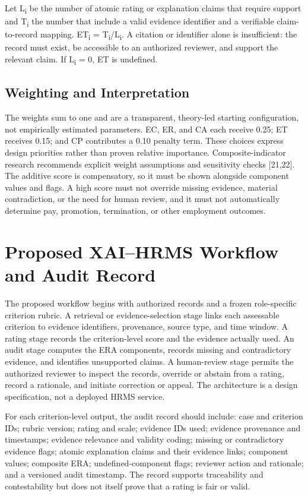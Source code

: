 \documentclass[
  10pt,
  a4paper,
  runningheads]{llncs}
\begin{document}
Let L\textsubscript{i} be the number of atomic rating or explanation claims that require
support and T\textsubscript{i} the number that include a valid evidence identifier and a
verifiable claim-to-record mapping. ET\textsubscript{i} = T\textsubscript{i}/L\textsubscript{i}. A citation or
identifier alone is insufficient: the record must exist, be accessible
to an authorized reviewer, and support the relevant claim. If L\textsubscript{i} = 0, ET
is undefined.

\subsection{Weighting and
Interpretation}\label{weighting-and-interpretation}

The weights sum to one and are a transparent, theory-led starting
configuration, not empirically estimated parameters. EC, ER, and CA each
receive 0.25; ET receives 0.15; and CP contributes a 0.10 penalty term.
These choices express design priorities rather than proven relative
importance. Composite-indicator research recommends explicit weight
assumptions and sensitivity checks {[}21,22{]}. The additive score is
compensatory, so it must be shown alongside component values and flags.
A high score must not override missing evidence, material contradiction,
or the need for human review, and it must not automatically determine
pay, promotion, termination, or other employment outcomes.

\section{Proposed XAI--HRMS Workflow and Audit
Record}\label{proposed-xaihrms-workflow-and-audit-record}

The proposed workflow begins with authorized records and a frozen
role-specific criterion rubric. A retrieval or evidence-selection stage
links each assessable criterion to evidence identifiers, provenance,
source type, and time window. A rating stage records the criterion-level
score and the evidence actually used. An audit stage computes the ERA
components, records missing and contradictory evidence, and identifies
unsupported claims. A human-review stage permits the authorized reviewer
to inspect the records, override or abstain from a rating, record a
rationale, and initiate correction or appeal. The architecture is a
design specification, not a deployed HRMS service.

For each criterion-level output, the audit record should include: case
and criterion IDs; rubric version; rating and scale; evidence IDs used;
evidence provenance and timestamps; evidence relevance and validity
coding; missing or contradictory evidence flags; atomic explanation
claims and their evidence links; component values; composite ERA;
undefined-component flags; reviewer action and rationale; and a
versioned audit timestamp. The record supports traceability and
contestability but does not itself prove that a rating is fair or valid.
\end{document}
